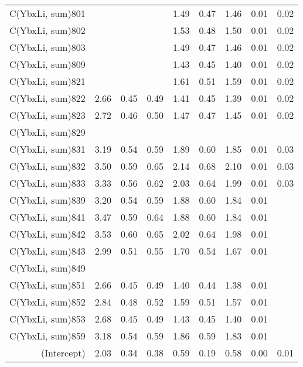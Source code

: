 \begin{table}[p]
\begin{tabular}{rrrrrrrrr}
  C(YbxLi, sum)801 &  &  &  & 1.49 & 0.47 & 1.46 & 0.01 & 0.02 \\ 
  C(YbxLi, sum)802 &  &  &  & 1.53 & 0.48 & 1.50 & 0.01 & 0.02 \\ 
  C(YbxLi, sum)803 &  &  &  & 1.49 & 0.47 & 1.46 & 0.01 & 0.02 \\ 
  C(YbxLi, sum)809 &  &  &  & 1.43 & 0.45 & 1.40 & 0.01 & 0.02 \\ 
  C(YbxLi, sum)821 &  &  &  & 1.61 & 0.51 & 1.59 & 0.01 & 0.02 \\ 
  C(YbxLi, sum)822 & 2.66 & 0.45 & 0.49 & 1.41 & 0.45 & 1.39 & 0.01 & 0.02 \\ 
  C(YbxLi, sum)823 & 2.72 & 0.46 & 0.50 & 1.47 & 0.47 & 1.45 & 0.01 & 0.02 \\ 
  C(YbxLi, sum)829 &  &  &  &  &  &  &  &  \\ 
  C(YbxLi, sum)831 & 3.19 & 0.54 & 0.59 & 1.89 & 0.60 & 1.85 & 0.01 & 0.03 \\ 
  C(YbxLi, sum)832 & 3.50 & 0.59 & 0.65 & 2.14 & 0.68 & 2.10 & 0.01 & 0.03 \\ 
  C(YbxLi, sum)833 & 3.33 & 0.56 & 0.62 & 2.03 & 0.64 & 1.99 & 0.01 & 0.03 \\ 
  C(YbxLi, sum)839 & 3.20 & 0.54 & 0.59 & 1.88 & 0.60 & 1.84 & 0.01 &  \\ 
  C(YbxLi, sum)841 & 3.47 & 0.59 & 0.64 & 1.88 & 0.60 & 1.84 & 0.01 &  \\ 
  C(YbxLi, sum)842 & 3.53 & 0.60 & 0.65 & 2.02 & 0.64 & 1.98 & 0.01 &  \\ 
  C(YbxLi, sum)843 & 2.99 & 0.51 & 0.55 & 1.70 & 0.54 & 1.67 & 0.01 &  \\ 
  C(YbxLi, sum)849 &  &  &  &  &  &  &  &  \\ 
  C(YbxLi, sum)851 & 2.66 & 0.45 & 0.49 & 1.40 & 0.44 & 1.38 & 0.01 &  \\ 
  C(YbxLi, sum)852 & 2.84 & 0.48 & 0.52 & 1.59 & 0.51 & 1.57 & 0.01 &  \\ 
  C(YbxLi, sum)853 & 2.68 & 0.45 & 0.49 & 1.43 & 0.45 & 1.40 & 0.01 &  \\ 
  C(YbxLi, sum)859 & 3.18 & 0.54 & 0.59 & 1.86 & 0.59 & 1.83 & 0.01 &  \\ 
  (Intercept) & 2.03 & 0.34 & 0.38 & 0.59 & 0.19 & 0.58 & 0.00 & 0.01 \\ 
   \hline
\end{tabular}
\end{table}
